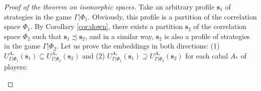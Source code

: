 \begin{proof}[Proof of the theorem on isomorphic spaces]
	Take an arbitrary profile $\mathbf{s}_1$ of strategies in the game $\Gamma | \Phi_1$. Obviously, this profile is a partition of the correlation space $\Phi_1$. By Corollary \ref{cor:down}, there exists a partition $\mathbf{s}_2$ of the correlation space $\Phi_2$ such that $\mathbf{s}_1 \precsim \mathbf{s}_2$, and in a similar way, $\mathbf{s}_2$ is also a profile of strategies in the game $\Gamma | \Phi_2$. Let us prove the embeddings in both directions: (1) $U_{\Gamma | \Phi_1}^{A_*}(\mathbf{s}_1) \subseteq U_{\Gamma | \Phi_2}^{A_*}(\mathbf{s}_2)$ and (2) $U_{\Gamma | \Phi_1}^{A_*}(\mathbf{s}_1) \supseteq U_{\Gamma | \Phi_2}^{A_*}(\mathbf{s}_2)$ for each cabal $A_*$ of players: %
	\begin{enumerate}

\end{enumerate}
\end{proof}
